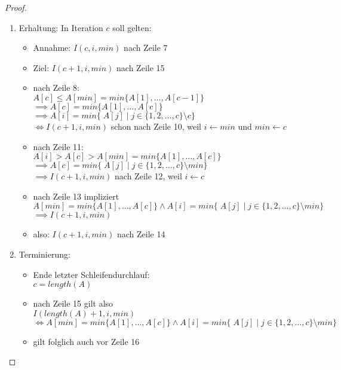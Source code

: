 \documentclass[12pt]{article}
\theoremstyle{remark}
\begin{document}
\begin{proof}
\begin{enumerate}
    \item Erhaltung:
    In Iteration $c$ soll gelten:
    \begin{itemize}
        \item Annahme: $I(c, i, min)$ nach Zeile 7
        \item Ziel: $I(c+1, i, min)$ nach Zeile 15
        \item nach Zeile 8: \\
           $A[c] \leq A[min] = min\{A[1], \ldots, A[c-1]\}$ \\
           $\implies A[c] = min\{A[1],\ldots, A[c]\}$ \\
           $\implies A[i] = min\{\; A[j] \;| \; j \in \{1,2, \ldots, c\}\setminus c\}$\\
           $\iff I(c+1, i, min)$ schon nach Zeile 10, weil $i \gets min$ und $min \gets c$
       \item nach Zeile 11: \\
           $A[i] > A[c] > A[min] = min\{A[1], \ldots, A[c]\}$ \\
           $\implies A[c] = min\{\; A[j] \;| \; j \in \{1,2, \ldots, c\}\setminus min\}$\\
           $\implies I(c+1, i, min)$ nach Zeile 12, weil $i \gets c$
        \item nach Zeile 13 impliziert  \\
           $A[min] = min\{A[1], \ldots, A[c]\} \land A[i] = min\{\; A[j] \;| \; j \in \{1,2, \ldots, c\}\setminus min\}$ \\
           $\implies I(c+1, i, min)$
        \item also: $I(c + 1, i, min)$ nach Zeile 14
    \end{itemize}
    \item Terminierung:
    \begin{itemize}
        \item Ende letzter Schleifendurchlauf:\\
        $c = length(A)$
        \item nach Zeile 15 gilt also\\
        $I(length(A)+1, i, min)$ \\
        $\iff A[min] = min\{A[1], \ldots, A[c]\} \land A[i] = min\{\; A[j] \;| \; j \in \{1,2, \ldots, c\}\setminus min\}$
        \item gilt folglich auch vor Zeile 16
    \end{itemize}
\end{enumerate}
\end{proof}
\newpage
\end{document}
